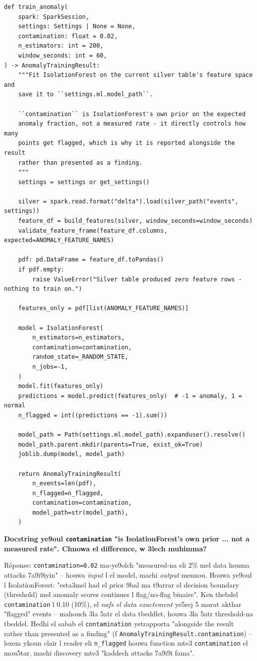 \documentclass[11pt,a4paper]{report}
\DeclareRobustCommand{\code}[1]{\texttt{#1}}
\begin{document}
\begin{lstlisting}[style=pystyle]
def train_anomaly(
    spark: SparkSession,
    settings: Settings | None = None,
    contamination: float = 0.02,
    n_estimators: int = 200,
    window_seconds: int = 60,
) -> AnomalyTrainingResult:
    """Fit IsolationForest on the current silver table's feature space and
    save it to ``settings.ml.model_path``.

    ``contamination`` is IsolationForest's own prior on the expected
    anomaly fraction, not a measured rate - it directly controls how many
    points get flagged, which is why it is reported alongside the result
    rather than presented as a finding.
    """
    settings = settings or get_settings()

    silver = spark.read.format("delta").load(silver_path("events", settings))
    feature_df = build_features(silver, window_seconds=window_seconds)
    validate_feature_frame(feature_df.columns, expected=ANOMALY_FEATURE_NAMES)

    pdf: pd.DataFrame = feature_df.toPandas()
    if pdf.empty:
        raise ValueError("Silver table produced zero feature rows - nothing to train on.")

    features_only = pdf[list(ANOMALY_FEATURE_NAMES)]

    model = IsolationForest(
        n_estimators=n_estimators,
        contamination=contamination,
        random_state=_RANDOM_STATE,
        n_jobs=-1,
    )
    model.fit(features_only)
    predictions = model.predict(features_only)  # -1 = anomaly, 1 = normal
    n_flagged = int((predictions == -1).sum())

    model_path = Path(settings.ml.model_path).expanduser().resolve()
    model_path.parent.mkdir(parents=True, exist_ok=True)
    joblib.dump(model, model_path)

    return AnomalyTrainingResult(
        n_events=len(pdf),
        n_flagged=n_flagged,
        contamination=contamination,
        model_path=str(model_path),
    )
\end{lstlisting}

\begin{soual}
\textbf{Docstring ye9oul \code{contamination} "is IsolationForest's own
prior ... not a measured rate". Chnowa el difference, w 3lech muhimma?}

Réponse: \code{contamination=0.02} ma-ye9olch "measured-na eli 2\% mel
data houma attacks 7a9i9iyin" -- houwa \emph{input} l el model, machi
\emph{output} mennou. Houwa ye9oul l IsolationForest: "esta3mel had el
prior 9bal ma t9arrar el decision boundary (threshold) mel anomaly
scores continues l flag/no-flag binaire". Ken thebdel \code{contamination}
l 0.10 (10\%), el \emph{nafs el data exactement} ye5rej 5 marat akthar
"flagged" events -- mahouch 3la 5atr el data tbeddlet, houwa 3la 5atr
threshold-na tbeddel. Hedhi el sabab el \code{contamination} yetrapporta
"alongside the result rather than presented as a finding" (f
\code{AnomalyTrainingResult.contamination}) -- lezem ykoun clair l reader
eli \code{n\_flagged} houwa function mte3 \code{contamination} el
mou5tar, machi discovery mte3 "kaddech attacks 7a9i9i fama".
\end{soual}
\end{document}
